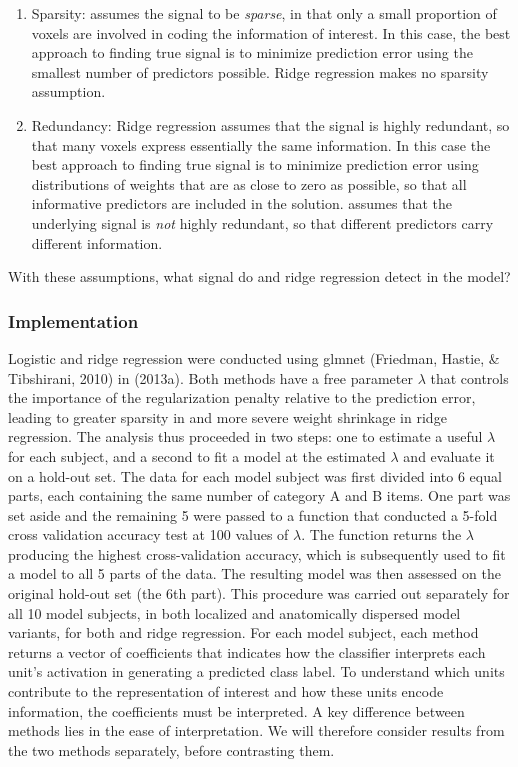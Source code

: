 \begin{enumerate}
\item Sparsity: {\lasso} assumes the signal to be {\em sparse}, in that only a small proportion of voxels are involved in coding the information of interest. In this case, the best approach to finding true signal is to minimize prediction error using the smallest number of predictors possible. Ridge regression makes no sparsity assumption.

\item Redundancy: Ridge regression assumes that the signal is highly redundant, so that many voxels express essentially the same information. In this case the best approach to finding true signal is to minimize prediction error using distributions of weights that are as close to zero as possible, so that all informative predictors are included in the solution. {\lasso} assumes that the underlying signal is {\em not} highly redundant, so that different predictors carry different information.
\end{enumerate}

With these assumptions, what signal do {\lasso} and ridge regression detect in the model?

\subsubsection{Implementation}
Logistic {\lasso} and ridge regression were conducted using glmnet (Friedman, Hastie, \& Tibshirani, 2010) in \matlab (2013a). Both methods have a free parameter $\lambda$ that controls the importance of the regularization penalty relative to the prediction error, leading to greater sparsity in {\lasso} and more severe weight shrinkage in ridge regression. The analysis thus proceeded in two steps: one to estimate a useful $\lambda$ for each subject, and a second to fit a model at the estimated $\lambda$ and evaluate it on a hold-out set. The data for each model subject was first divided into 6 equal parts, each containing the same number of category A and B items. One part was set aside and the remaining 5 were passed to a function that conducted a 5-fold cross validation accuracy test at 100 values of $\lambda$. The function returns the $\lambda$ producing the highest cross-validation accuracy, which is subsequently used to fit a model to all 5 parts of the data. The resulting model was then assessed on the original hold-out set (the 6th part). This procedure was carried out separately for all 10 model subjects, in both localized and anatomically dispersed model variants, for both {\lasso} and ridge regression. For each model subject, each method returns a vector of coefficients that indicates how the classifier interprets each unit's activation in generating a predicted class label. To understand which units contribute to the representation of interest and how these units encode information, the coefficients must be interpreted. A key difference between methods lies in the ease of interpretation. We will therefore consider results from the two methods separately, before contrasting them.

